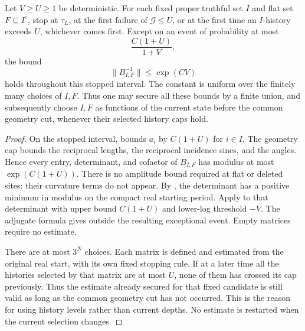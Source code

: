 \begin{lemma}
\label{odd:modified-inverses}
Let \(V\ge U\ge1\) be deterministic.  For each fixed proper truthful set
\(I\) and flat set \(F\subseteq I^c\), stop at \(\tau_L\), at the first
failure of \(\mathcal G\le U\), or at the first time an \(I\)-history
exceeds \(U\), whichever comes first.  Except on an event of probability
at most
\begin{equation}
 \frac{C(1+U)}{1+V},
 \label{odd:inverse-failure}
\end{equation}
the bound
\begin{equation}
 \|B_{I,F}^{-1}\|\le\exp(CV)
 \label{odd:inverse-bound}
\end{equation}
holds throughout this stopped interval.  The constant is uniform over
the finitely many choices of \(I,F\).  Thus one may secure all these
bounds by a finite union, and subsequently choose \(I,F\) as functions of
the current state before the common geometry cut, whenever their selected
history caps hold.
\end{lemma}

\begin{proof}
On the stopped interval,  bounds \(a_i\) by
\(C(1+U)\) for \(i\in I\).  The geometry cap bounds the reciprocal
lengths, the reciprocal incidence sines, and the angles.  Hence every
entry, determinant, and cofactor of \(B_{I,F}\) has modulus at most
\(\exp(C(1+U))\).  There is no amplitude bound required at flat or deleted
sites: their curvature terms do not appear.  By ,
the determinant has a positive minimum in modulus on the compact real
starting period.  Apply  to that determinant with
upper bound \(C(1+U)\) and lower-log threshold \(-V\).  The adjugate
formula gives  outside the resulting exceptional
event.  Empty matrices require no estimate.

There are at most \(3^N\) choices.  Each matrix is defined and estimated
from the original real start, with its own fixed stopping rule.  If at
a later time all the histories selected by that matrix are at most \(U\),
none of them has crossed its cap previously.  Thus the estimate already
secured for that fixed candidate is still valid as long as the common
geometry cut has not occurred.  This is the reason for
using history levels rather than current depths.  No estimate is restarted
when the current selection changes.
\end{proof}

